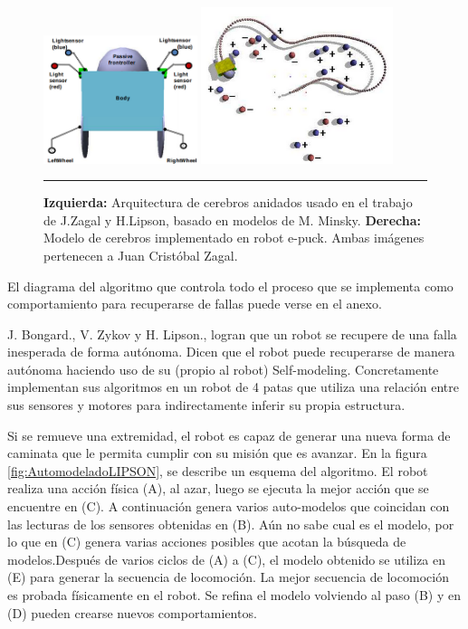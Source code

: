 \begin{figure}[htbp]
	\centering
		\includegraphics[width=0.4\textwidth]{./Figures/robotTest.png}
		\includegraphics[width=0.5\textwidth]{./Figures/implementacion.png}
		\rule{35em}{0.5pt}
	\caption[Automodelado]{\textbf{Izquierda:} Arquitectura de cerebros anidados usado en el trabajo de J.Zagal y H.Lipson, basado en modelos de M. Minsky. \textbf{Derecha:} Modelo de cerebros implementado en robot e-puck. Ambas imágenes  pertenecen a Juan Cristóbal Zagal.}
	\label{fig:AutomodeladoTest}
\end{figure}


El diagrama del algoritmo que controla todo el proceso que se implementa como comportamiento para recuperarse de fallas puede verse en el anexo.

J. Bongard., V. Zykov y H. Lipson., logran que un robot se recupere de una falla inesperada de forma autónoma. Dicen que el robot puede recuperarse de manera autónoma haciendo uso de su (propio al robot) Self-modeling. Concretamente implementan sus algoritmos en un robot de 4 patas que utiliza una relación entre sus sensores y motores para indirectamente inferir su propia estructura.


Si se remueve una extremidad, el robot es capaz de generar una nueva forma de caminata que le permita cumplir con su misión que es avanzar.
En la figura \ref{fig:AutomodeladoLIPSON}, se describe un esquema del algoritmo. El robot realiza una acción física (A), al azar, luego se ejecuta la mejor acción que se encuentre en (C). A continuación genera varios auto-modelos que coincidan con las lecturas de los sensores obtenidas en (B). Aún no sabe cual es el modelo, por lo que en (C) genera varias acciones posibles que acotan la búsqueda de modelos.Después de varios ciclos de (A) a (C),  el modelo obtenido se utiliza en (E) para generar la secuencia de locomoción. La mejor secuencia de locomoción es probada físicamente en el robot. Se refina el modelo volviendo al paso (B) y en (D) pueden crearse nuevos comportamientos.

